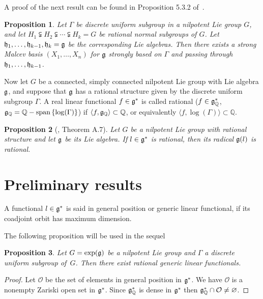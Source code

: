 \documentclass[11pt]{article}
\newtheorem{proposition}{Proposition}
\providecommand{\mathds}[1]{\mathbb{#1}}
\newcommand{\set}[1]{\left\{#1\right\}}
\DeclareMathOperator{\spannq}{\mathds{Q}-span}
\DeclareMathOperator{\Log}{log} \DeclareMathOperator{\Ad}{Ad}
\def\Log#1{\operatorname{log}(#1)}
\begin{document}
A  proof of the next result can be found in Proposition 5.3.2 of~\cite{Cor1}.

\begin{proposition}\label{suite-adapte-rational}
Let $\Gamma$ be  discrete uniform subgroup in a nilpotent Lie group
$G$, and let $H_1\subsetneqq H_2\subsetneqq\cdots \subsetneqq H_k =G$
be  rational normal subgroups of $G$. Let $\frak h_1, \ldots, \frak
h_{k-1}, \frak h_k =\frak g$ be the corresponding Lie algebras. Then
there exists a strong Malcev basis $(X_1,\ldots, X_n)$ for $\frak g$
strongly based on $\Gamma$ and passing through $\frak h_1, \ldots,
\frak h_{k-1}$.
\end{proposition}


 Now let $G$ be a connected, simply connected nilpotent Lie
group with Lie algebra $\frak g$, and suppose that $\frak g$ has a
rational structure given by  the discrete uniform subgroup $\Gamma$.
A real linear functional $f \in \frak g^*$ is called rational ($f\in
\frak g_\mathds{Q}^*$,  $\frak
g_\mathds{Q}=\spannq\set{\Log{\Gamma}}$) if $\langle f, \frak
g_\mathds{Q}\rangle \subset \mathds{Q}$, or equivalently $\langle f,
\Log{\Gamma} \rangle \subset \mathds{Q}$.


\begin{proposition}[\cite{Cor9}, Theorem A.7] Let $G$ be a nilpotent Lie group with rational
structure and let $\frak g$ be its Lie algebra. If $l\in \frak g^*$
is rational, then its radical $\frak g(l)$ is rational.
\end{proposition}


\section{Preliminary  results}\label{section3}


\begin{definition} A functional $l\in \frak g^*$ is said in general
position or generic linear functional, if its coadjoint orbit has
maximum dimension.
\end{definition}
 The following proposition will be used in the sequel

\begin{proposition}\label{rational-functional}
Let $G = \exp(\frak g)$ be a nilpotent Lie group and $\Gamma$ a
discrete uniform subgroup of~$G$. Then there exist rational generic
linear functionals.
\end{proposition}

\begin{proof}
Let $\mathcal{O}$ be the set of elements in general position in
$\frak g^*$. We have $\mathcal{O}$ is a nonempty Zariski open set
in $\frak g^*$. Since $\frak g_\mathds{Q}^* $ is dense in $\frak
g^*$ then $\frak g_\mathds{Q}^*\cap \mathcal{O} \ne \varnothing$.
\end{proof}
\end{document}
